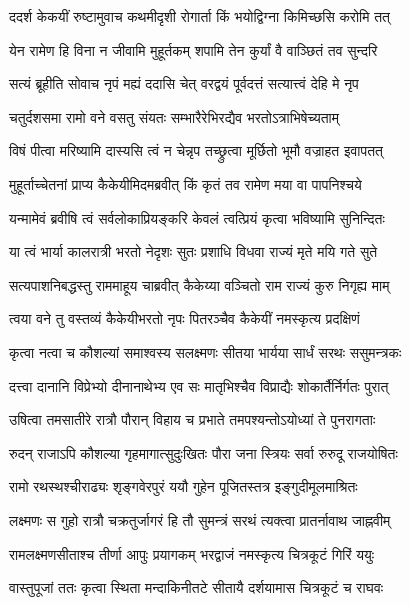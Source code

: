 \twolineshloka
{ददर्श केकयीं रुष्टामुवाच कथमीदृशी}
{रोगार्ता किं भयोद्विग्ना किमिच्छसि करोमि तत्} %

\twolineshloka
{येन रामेण हि विना न जीवामि मुहूर्तकम्}
{शपामि तेन कुर्यां वै वाञ्छितं तव सुन्दरि} %

\twolineshloka
{सत्यं ब्रूहीति सोवाच नृपं मह्यं ददासि चेत्}
{वरद्वयं पूर्वदत्तं सत्यात्त्वं देहि मे नृप} %

\twolineshloka
{चतुर्दशसमा रामो वने वसतु संयतः}
{सम्भारैरेभिरद्यैव भरतोऽत्राभिषेच्यताम्} %

\twolineshloka
{विषं पीत्वा मरिष्यामि दास्यसि त्वं न चेन्नृप}
{तच्छ्रुत्वा मूर्छितो भूमौ वज्राहत इवापतत्} %

\twolineshloka
{मुहूर्ताच्चेतनां प्राप्य कैकेयीमिदमब्रवीत्}
{किं कृतं तव रामेण मया वा पापनिश्चये} %

\twolineshloka
{यन्मामेवं ब्रवीषि त्वं सर्वलोकाप्रियङ्करि}
{केवलं त्वत्प्रियं कृत्वा भविष्यामि सुनिन्दितः} %

\twolineshloka
{या त्वं भार्या कालरात्री भरतो नेदृशः सुतः}
{प्रशाधि विधवा राज्यं मृते मयि गते सुते} %

\twolineshloka
{सत्यपाशनिबद्धस्तु राममाहूय चाब्रवीत्}
{कैकेय्या वञ्चितो राम राज्यं कुरु निगृह्य माम्} %

\twolineshloka
{त्वया वने तु वस्तव्यं कैकेयीभरतो नृपः}
{पितरञ्चैव कैकेयीं नमस्कृत्य प्रदक्षिणं} %

\twolineshloka
{कृत्वा नत्वा च कौशल्यां समाश्वस्य सलक्ष्मणः}
{सीतया भार्यया सार्धं सरथः ससुमन्त्रकः} %

\twolineshloka
{दत्त्वा दानानि विप्रेभ्यो दीनानाथेभ्य एव सः}
{मातृभिश्चैव विप्राद्यैः शोकार्तैर्निर्गतः पुरात्} %

\twolineshloka
{उषित्वा तमसातीरे रात्रौ पौरान् विहाय च}
{प्रभाते तमपश्यन्तोऽयोध्यां ते पुनरागताः} %

\twolineshloka
{रुदन् राजाऽपि कौशल्या गृहमागात्सुदुःखितः}
{पौरा जना स्त्रियः सर्वा रुरुदू राजयोषितः} %

\twolineshloka
{रामो रथस्थश्चीराढ्यः शृङ्गवेरपुरं ययौ}
{गुहेन पूजितस्तत्र इङ्गुदीमूलमाश्रितः} %

\twolineshloka
{लक्ष्मणः स गुहो रात्रौ चक्रतुर्जागरं हि तौ}
{सुमन्त्रं सरथं त्यक्त्वा प्रातर्नावाथ जाह्नवीम्} %

\twolineshloka
{रामलक्ष्मणसीताश्च तीर्णा आपुः प्रयागकम्}
{भरद्वाजं नमस्कृत्य चित्रकूटं गिरिं ययुः} %

\twolineshloka
{वास्तुपूजां ततः कृत्वा स्थिता मन्दाकिनीतटे}
{सीतायै दर्शयामास चित्रकूटं च राघवः} %

